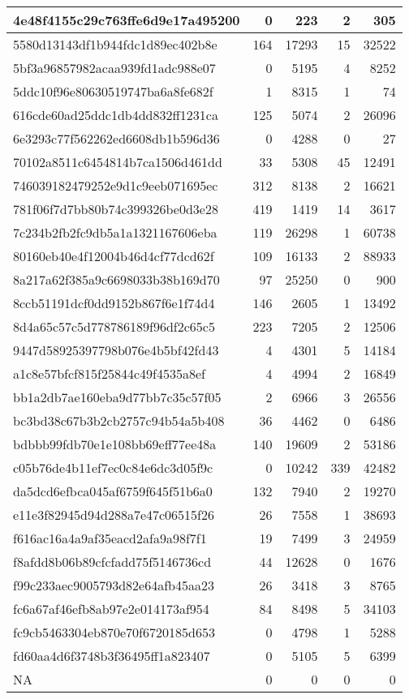 \documentclass[]{article}
\begin{document}
\begin{table}[t]
\begin{tabular}{l|r|r|r|r}
\hline
4e48f4155c29c763ffe6d9e17a495200 & 0 & 223 & 2 & 305\\
\hline
5580d13143df1b944fdc1d89ec402b8e & 164 & 17293 & 15 & 32522\\
\hline
5bf3a96857982acaa939fd1adc988e07 & 0 & 5195 & 4 & 8252\\
\hline
5ddc10f96e80630519747ba6a8fe682f & 1 & 8315 & 1 & 74\\
\hline
616cde60ad25ddc1db4dd832ff1231ca & 125 & 5074 & 2 & 26096\\
\hline
6e3293c77f562262ed6608db1b596d36 & 0 & 4288 & 0 & 27\\
\hline
70102a8511c6454814b7ca1506d461dd & 33 & 5308 & 45 & 12491\\
\hline
746039182479252e9d1c9eeb071695ec & 312 & 8138 & 2 & 16621\\
\hline
781f06f7d7bb80b74c399326be0d3e28 & 419 & 1419 & 14 & 3617\\
\hline
7c234b2fb2fc9db5a1a1321167606eba & 119 & 26298 & 1 & 60738\\
\hline
80160eb40e4f12004b46d4cf77dcd62f & 109 & 16133 & 2 & 88933\\
\hline
8a217a62f385a9c6698033b38b169d70 & 97 & 25250 & 0 & 900\\
\hline
8ccb51191dcf0dd9152b867f6e1f74d4 & 146 & 2605 & 1 & 13492\\
\hline
8d4a65c57c5d778786189f96df2c65c5 & 223 & 7205 & 2 & 12506\\
\hline
9447d58925397798b076e4b5bf42fd43 & 4 & 4301 & 5 & 14184\\
\hline
a1c8e57bfcf815f25844c49f4535a8ef & 4 & 4994 & 2 & 16849\\
\hline
bb1a2db7ae160eba9d77bb7c35c57f05 & 2 & 6966 & 3 & 26556\\
\hline
bc3bd38c67b3b2cb2757c94b54a5b408 & 36 & 4462 & 0 & 6486\\
\hline
bdbbb99fdb70e1e108bb69eff77ee48a & 140 & 19609 & 2 & 53186\\
\hline
c05b76de4b11ef7ec0c84e6dc3d05f9c & 0 & 10242 & 339 & 42482\\
\hline
da5dcd6efbca045af6759f645f51b6a0 & 132 & 7940 & 2 & 19270\\
\hline
e11e3f82945d94d288a7e47c06515f26 & 26 & 7558 & 1 & 38693\\
\hline
f616ac16a4a9af35eacd2afa9a98f7f1 & 19 & 7499 & 3 & 24959\\
\hline
f8afdd8b06b89cfcfadd75f5146736cd & 44 & 12628 & 0 & 1676\\
\hline
f99c233aec9005793d82e64afb45aa23 & 26 & 3418 & 3 & 8765\\
\hline
fc6a67af46efb8ab97e2e014173af954 & 84 & 8498 & 5 & 34103\\
\hline
fc9cb5463304eb870e70f6720185d653 & 0 & 4798 & 1 & 5288\\
\hline
fd60aa4d6f3748b3f36495ff1a823407 & 0 & 5105 & 5 & 6399\\
\hline
NA & 0 & 0 & 0 & 0\\
\hline
\end{tabular}
\end{table}
\end{document}
